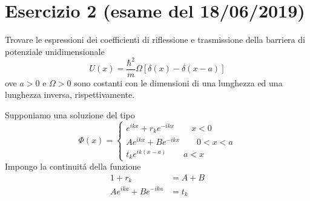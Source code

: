 \documentclass[a4paper]{article}
\begin{document}
    \section*{Esercizio 2 (esame del 18/06/2019)}
        Trovare le espressioni dei coefficienti di riflessione e trasmissione della barriera di potenziale unidimensionale
        \begin{equation*}
            U(x)=\frac{\hbar^2}{m}\Omega\left[\delta(x)-\delta(x-a)\right]
        \end{equation*}
        ove $a > 0$ e $\Omega > 0$ sono costanti con le dimensioni di una lunghezza ed una lunghezza inversa, rispettivamente.
        \begin{figure}[H]
            \centering
        \end{figure}
        Supponiamo una soluzione del tipo
        \begin{equation*}
            \Phi(x)=
            \begin{cases}
                e^{ikx}+r_ke^{-ikx} \quad\quad x<0\\
                Ae^{ikx}+Be^{-ikx} \quad\quad 0<x<a\\
                t_ke^{ik(x-a)} \quad\quad a<x
            \end{cases}
        \end{equation*}
        Impongo la continuit\'a della funzione
        \begin{equation*}
            \begin{split}
                1+r_k&=A+B\\
                Ae^{ika}+Be^{-ika}&=t_k
            \end{split}
        \end{equation*}
\end{document}
